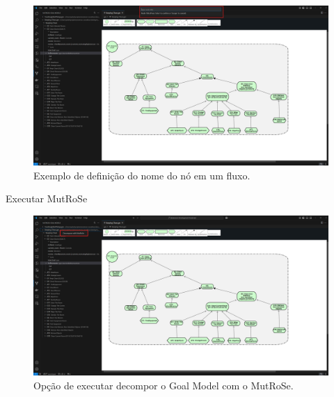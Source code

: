 \documentclass{beamer}
\begin{document}
\begin{frame}
  \begin{figure}[!h]
    \centering
    \includegraphics[width=1\textwidth]{flow2.png} 
    \caption{Exemplo de definição do nome do nó em um fluxo.}
  \end{figure}
\end{frame}
\begin{frame}{Executar MutRoSe}
  \begin{figure}[!h]
    \centering
    \includegraphics[width=1\textwidth]{decompose.png} 
    \caption{Opção de executar decompor o Goal Model com o MutRoSe.}
  \end{figure}
\end{frame}
\end{document}
